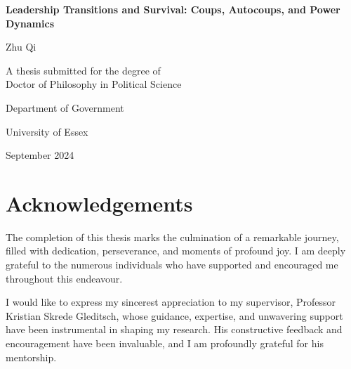 \documentclass[
  12pt,
]{report}
\author{}
\date{}
\renewcommand*\contentsname{Table of contents}
\newcommand\contentsname{Table of contents}
\begin{document}
\begin{titlepage}
  \begin{center}
    \vspace*{2cm}
    
    \Huge{\textbf{Leadership Transitions and Survival: Coups, Autocoups, and Power Dynamics}}
    
    \vspace{1.5cm}
    
    \Large{Zhu Qi}
    
    \vspace{5cm}
    
    \large{A thesis submitted for the degree of \\ Doctor of Philosophy in Political Science}
    
    \vspace{0.8cm}
    
    \large{Department of Government}
    \vspace{0.5cm}
    
    \large{University of Essex}
    
    \vspace{1.5cm}
    
    \large{September 2024}
    \vspace{2cm}
    
    
  \end{center}
\end{titlepage}

\renewcommand*\contentsname{Contents}
{
\hypersetup{linkcolor=}
\setcounter{tocdepth}{2}
\tableofcontents
}
\listoffigures
\listoftables

\chapter*{Acknowledgements}\label{acknowledgements}

The completion of this thesis marks the culmination of a remarkable
journey, filled with dedication, perseverance, and moments of profound
joy. I am deeply grateful to the numerous individuals who have supported
and encouraged me throughout this endeavour.

I would like to express my sincerest appreciation to my supervisor,
Professor Kristian Skrede Gleditsch, whose guidance, expertise, and
unwavering support have been instrumental in shaping my research. His
constructive feedback and encouragement have been invaluable, and I am
profoundly grateful for his mentorship.
\end{document}
